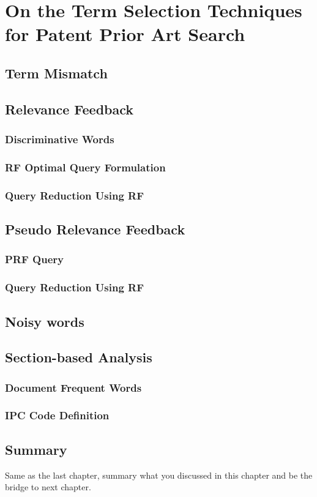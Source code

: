 \chapter{On the Term Selection Techniques for Patent Prior Art Search}
\label{cha:analysis}

\section{Term Mismatch}
\label{sec:termmismatch}

\section{Relevance Feedback}

\subsection{Discriminative Words}
\label{sec:discriminative}

\subsection{RF Optimal Query Formulation}
\label{sec:formulation}

\subsection{Query Reduction Using RF}

\section{Pseudo Relevance Feedback}

\subsection{PRF Query}
\subsection{Query Reduction Using RF}

\section{Noisy words}

\section{Section-based Analysis}

\subsection{Document Frequent Words}

\subsection{IPC Code Definition}

\section{Summary}
Same as the last chapter, summary what you discussed in this chapter and
be the bridge to next chapter.
